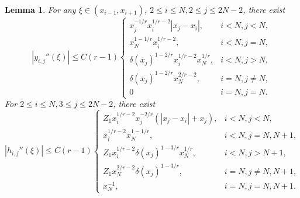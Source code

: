 \documentclass{amsart}
\newtheorem{lemma}[theorem]{Lemma}
\theoremstyle{definition}
\theoremstyle{remark}
\numberwithin{equation}{section}
\begin{document}
\begin{lemma} \label{lmm:esitmate-of-MTFs-2}
  For any \(\xi \in (x_{i-1}, x_{i+1})\), \(2\le i \le N, 2\le j \le 2N-2\), there exist
  \begin{equation*}
    |y_{i,j}''(\xi)| \le C(r-1)
    \begin{cases}
      x_j^{-1/r} x_i^{1/r-2} |x_j - x_i|  ,& i < N, j < N,  \\
      x_N^{1-1/r} x_i^{1/r-2}             ,& i < N, j = N , \\
      \delta(x_j)^{1-2/r} x_i^{1/r-2} x_N^{1/r}     ,& i < N, j > N , \\
      \delta(x_j)^{1-2/r} x_N^{2/r-2}             ,& i = N, j \neq N , \\
      0   & i = N, j = N.
    \end{cases}
  \end{equation*}
  For \(2\le i \le N, 3\le j \le 2N-2\),  there exist 
  \begin{equation*}
    |h_{i,j}''(\xi)| \le C (r-1)
    \begin{cases}
      Z_1 x_i^{1/r-2} x_j^{-2/r} (|x_j - x_i| + x_j)   ,& i < N, j < N , \\
      x_i^{1/r-2} x_N^{1-1/r}                        ,& i < N, j=N, N+1, \\
      Z_1 x_i^{1/r-2} \delta(x_j)^{1-3/r}  x_N^{1/r}    ,& i < N, j>N+1 ,\\
      Z_1 x_N^{2/r-2} \delta(x_j)^{1-3/r}               ,& i = N, j \neq N, N+1 , \\
      x_N^{-1}                                       ,& i = N, j = N, N+1.
    \end{cases}
  \end{equation*}
\end{lemma}
\end{document}
